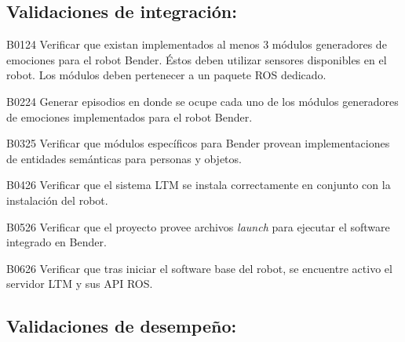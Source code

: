 \subsection{Validaciones de integración: }

\begin{def-validacion}{B}{01}{24}
	Verificar que existan implementados al menos 3 módulos generadores de emociones para el robot Bender. Éstos deben utilizar sensores disponibles en el robot. Los módulos deben pertenecer a un paquete ROS dedicado.	
\end{def-validacion}

\begin{def-validacion}{B}{02}{24}
	Generar episodios en donde se ocupe cada uno de los módulos generadores de emociones implementados para el robot Bender.
\end{def-validacion}

\begin{def-validacion}{B}{03}{25}
Verificar que módulos específicos para Bender provean implementaciones de entidades semánticas para personas y objetos.
\end{def-validacion}

\begin{def-validacion}{B}{04}{26}
Verificar que el sistema LTM se instala correctamente en conjunto con la instalación del robot.	
\end{def-validacion}

\begin{def-validacion}{B}{05}{26}
Verificar que el proyecto provee archivos \textit{launch} para ejecutar el software integrado en Bender.
\end{def-validacion}

\begin{def-validacion}{B}{06}{26}
Verificar que tras iniciar el software base del robot, se encuentre activo el servidor LTM y sus API ROS.
\end{def-validacion}


\subsection{Validaciones de desempeño: }

